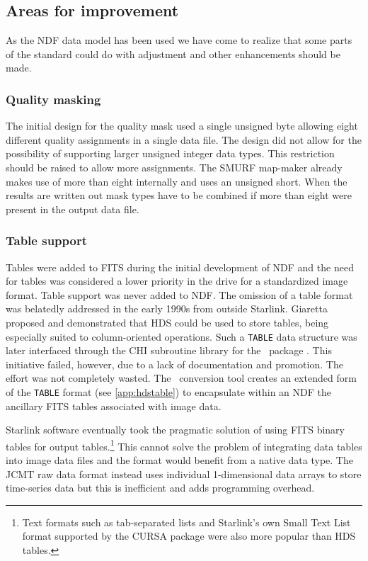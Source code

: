 \documentclass[final,authoryear,5p,times,twocolumn]{elsarticle}
\begin{document}
\subsection{Areas for improvement}

As the NDF data model has been used we have come to realize that some
parts of the standard could do with adjustment and other enhancements
should be made.

\subsubsection{Quality masking}

The initial design for the quality mask used a single unsigned byte
allowing eight different quality assignments in a single data file. The
design did not allow for the possibility of supporting larger unsigned
integer data types. This restriction should be raised to allow more
assignments. The SMURF map-maker
\citep[][]{2013MNRAS.430.2545C} already makes use of more
than eight internally and uses an unsigned short. When the results are
written out mask types have to be combined if more than eight were present
in the output data file.

\subsubsection{Table support}

Tables were added to FITS \citep{1988A&AS...73..365H} during the
initial development of NDF and the need for tables was considered a
lower priority in the
drive for a standardized image format.  Table support was never added
to NDF.  The omission of a table format was belatedly addressed in the
early 1990s from outside Starlink.  Giaretta proposed and demonstrated
that HDS could be used to store tables, being especially suited to
column-oriented operations.  Such a \texttt{TABLE} data structure was
later interfaced through the CHI subroutine library \citep{SUN119} for
the \catpac\ package \citep{SUN120}.  This initiative failed, however,
due to a lack of documentation and promotion.  The effort was not
completely wasted.  The \fitstondf\ conversion tool \citep{SUN55}
creates an extended form of the \texttt{TABLE} format (see
\ref{app:hdstable}) to encapsulate within an NDF the ancillary FITS
tables associated with image data.

Starlink software eventually took the pragmatic solution of using FITS
binary tables \citep{1995A&AS..113..159C} for output
tables.\footnote{Text formats such as tab-separated lists and
Starlink's own Small Text List format supported by the CURSA package
\citep{2001ASPC..232..314D} were also more popular than HDS tables.}
This cannot solve the problem of integrating data tables into image
data files and the format would benefit from a native data type. The
JCMT raw data format instead uses individual 1-dimensional data arrays
to store time-series data but this is inefficient and adds programming
overhead.
\end{document}

